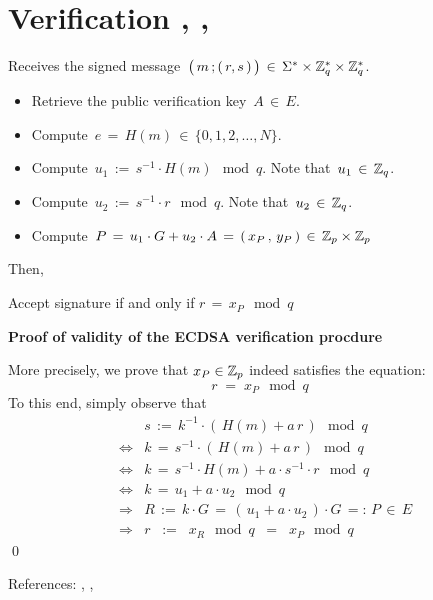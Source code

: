 
\section{Verification \cite{Yan2013}, \cite{Paar2010}, \cite{Garrett2005}}
\setcounter{theorem}{0}
\setcounter{equation}{0}


Receives the signed message
\,$\left(\,m \,\overset{{\color{white}.}}{;}\,(\,r,s\,)\,\right) \,\in\, \Sigma^{*} \times \Z_{q}^{*} \times \Z_{q}^{*}$.

\begin{itemize}
\item
	Retrieve the public verification key \,$A \,\in\, E$.
\item
	Compute \,$e \,=\, H(m) \,\in\, \{0,1,2,\ldots,N\}$.
\item
	Compute \,$u_{1} \,:=\, s^{-1} \cdot H(m) \!\mod q$.\; Note that \,$u_{1}\,\in\, \mathbb{Z}_{q}$.
\item
	Compute \,$u_{2} \,:=\, s^{-1} \cdot r \!\mod q$.\; Note that \,$u_{2}\,\in\, \mathbb{Z}_{q}$.
\item
	Compute \,$P \,=\, u_{1}\cdot G +  u_{2} \cdot A \,=\, (\,x_{P}\,,\, y_{P}\,) \,\in\, \mathbb{Z}_{p} \times \mathbb{Z}_{p}$
\end{itemize}

\noindent
Then,
\begin{center}
Accept signature\;\; if and only if \;\;$r \,=\, x_{P} \!\mod q$
\end{center}


\vskip 0.8cm
\noindent
\textbf{Proof of validity of the ECDSA verification procdure}

\vskip 0.3cm
\noindent
More precisely, we prove that $x_{P} \in \mathbb{Z}_{p}$ indeed satisfies the equation:
\begin{equation*}
r \;=\; x_{P} \!\mod q
\end{equation*}
To this end, simply observe that
\begin{eqnarray*}
&&
	s \,:=\, k^{-1} \cdot\left(\,H(m) + a\,r\,\right) \!\mod q
\\
&\Longleftrightarrow&
	k \,=\, s^{-1} \cdot\left(\,H(m) + a\,r\,\right)	\!\mod q
\\
&\Longleftrightarrow&
	k \,=\, s^{-1} \cdot H(m) + a \cdot s^{-1} \cdot r \!\mod q
\\
&\Longleftrightarrow&
	k \,=\, u_{1} + a \cdot u_{2} \!\mod q
\\
&\Longrightarrow&
	R \,:=\, k \cdot G \,=\, \left(\,u_{1} + a \cdot u_{2} \,\right) \cdot G \,=:\, P \,\in\, E 
\\
&\Longrightarrow&
	r \;\;:=\;\; x_{R}\!\!\mod q \;\;=\;\; x_{P} \!\!\mod q
\end{eqnarray*}
\qed

\vskip 0.0cm
\noindent
References: \cite{Yan2013}, \cite{Paar2010}, \cite{Garrett2005}
